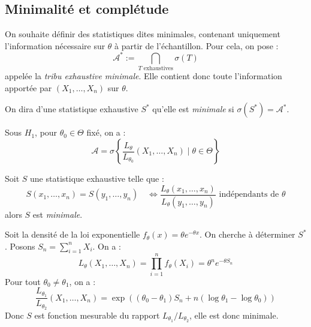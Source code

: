 \subsection{Minimalité et complétude}

On souhaite définir des statistiques dites minimales, contenant uniquement l'information nécessaire 
sur $ \theta$ à partir de l'échantillon. Pour cela, on pose : 
    $$ \mathcal{A}^* := \bigcap_{T \text{ exhaustives}} \sigma(T) $$ 
appelée la \emph{tribu exhaustive minimale}. Elle contient donc toute l'information apportée par 
$(X_1, \dots, X_n)$ sur $ \theta$. 

\begin{definition}
    On dira d'une statistique exhaustive $S^*$ qu'elle est \emph{minimale} si $ \sigma(S^*) = \mathcal{A}^*$. 
\end{definition}

\begin{proposition}
    Sous $ H_1$, pour $ \theta_0 \in \Theta$ fixé, on a : 
        $$ 
            \mathcal{A} = \sigma \left\{
                \frac{L_\theta}{L_{\theta_0}} (X_1, \dots, X_n) \mid \theta \in \Theta
            \right\}
        $$
\end{proposition}

\begin{proposition}
    Soit $S$ une statistique exhaustive telle que : 
        \begin{equation}
            S(x_1, \dots, x_n) = S(y_1, \dots, y_n) \quad \iff \frac{L_\theta(x_1, \dots, x_n)}{L_\theta(y_1, \dots, y_n)}
            \text{ indépendants de } \theta
        \end{equation}
    alors $S$ est \emph{minimale}. 
\end{proposition}

\begin{example}
    Soit la densité de la loi exponentielle $ f_\theta(x) = \theta e^{ - \theta x} $. On cherche à déterminer $S^*$. 
    Posons $ S_n = \sum_{i=1}^{n} X_i$. On a : 
        $$ L_\theta(X_1, \dots, X_n) = \prod_{i=1}^{n} f_\theta(X_i) = \theta^n e^{- \theta S_n} $$ 
    Pour tout $ \theta_0 \not = \theta_1$, on a :
        $$ 
            \frac{L_{\theta_1}}{L_{\theta_2}}(X_1, \dots, X_n) = \exp (( \theta_0 - \theta_1) S_n + n(\log \theta_1 - \log \theta_0))
        $$ 
    Donc $S$ est fonction mesurable du rapport $ L_{\theta_1}/L_{\theta_2}$, elle est donc minimale. 
\end{example}

